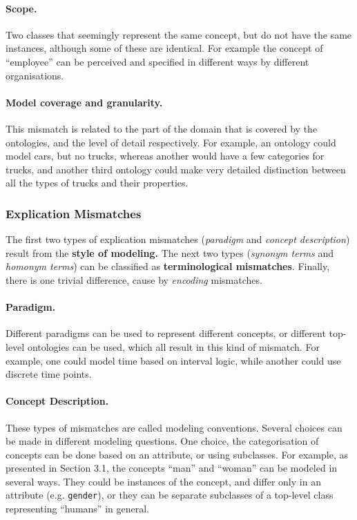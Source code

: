 \documentclass{fast_latex}
\begin{document}
\paragraph{Scope.}

Two classes that seemingly represent the same concept, but do not have
the same instances, although some of these are identical. For example
the concept of {\textquotedblleft}employee{\textquotedblright} can be
perceived and specified in different ways by different organisations. 

\paragraph{Model coverage and granularity.}
This mismatch is related to the part of the domain that is covered by
the ontologies, and the level of detail respectively. For example, an
ontology could model cars, but no trucks, whereas another would have a
few categories for trucks, and another third ontology could make very
detailed distinction between all the types of trucks and their
properties. 

\subsubsection{Explication Mismatches}
The first two types of explication mismatches (\textit{paradigm} and
\textit{concept description}) result from the \textbf{style of
modeling.} The next two types (\textit{synonym terms} and
\textit{homonym terms}) can be classified as \textbf{terminological
mismatches}. Finally, there is one trivial difference, cause by
\textit{encoding} mismatches. 

\paragraph{Paradigm.}
Different paradigms can be used to represent different concepts, or
different top-level ontologies can be used, which all result in this
kind of mismatch. For example, one could model time based on interval
logic, while another could use discrete time points. 

\paragraph{Concept Description.}
These types of mismatches are called modeling conventions. Several
choices can be made in different modeling questions. One choice, the
categorisation of concepts can be done based on an attribute, or using
subclasses. For example, as presented in Section 3.1, the concepts
{\textquotedblleft}man{\textquotedblright} and
{\textquotedblleft}woman{\textquotedblright} can be modeled in several
ways. They could be instances of the concept, and differ only in an
attribute (e.g. \texttt{gender}), or they can be separate
subclasses of a top-level class representing
{\textquotedblleft}humans{\textquotedblright} in general. 
\end{document}
